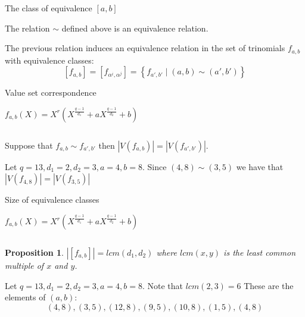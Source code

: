 \documentclass{beamer}
\newtheorem{proposition}{Proposition}
\begin{document}
\begin{frame}{The class of equivalence $[a,b]$}
  
  \begin{lemma}
    The relation $\sim$ defined above is an equivalence relation.
  \end{lemma}

  The previous relation induces an equivalence relation in the set of trinomials $f_{a,b}$ with equivalence classes:
  $$ [f_{a,b}] = [f_{\alpha^i, \alpha^j}] = \left\{ f_{a',b'} \mid (a,b) \sim (a',b') \right\} $$

\end{frame}

\begin{frame}{Value set correspondence}

  {\Large $f_{a,b}(X) = X^r(X^{\frac{q-1}{d_1}} + aX^{\frac{q-1}{d_2}} +b)$}

  $$$$

  \begin{theorem}

    Suppose that $f_{a, b} \sim f_{a',b'}$ then $|V(f_{a, b})| = |V(f_{a', b'})|$.

  \end{theorem}

  \begin{example}
    Let $q = 13, d_1 = 2, d_2 = 3, a = 4, b = 8$. Since $(4,8) \sim (3,5)$ we have that $|V(f_{4, 8})| = |V(f_{3, 5})|$
  \end{example}

\end{frame}

\begin{frame}{Size of equivalence classes}
  
  {\Large $f_{a,b}(X) = X^r(X^{\frac{q-1}{d_1}} + aX^{\frac{q-1}{d_2}} +b)$}

  $$$$

  \begin{proposition}
    $|[f_{a, b}]| = lcm(d_1,d_2)$ where $lcm(x,y)$ is the least common multiple of $x$ and $y$.
  \end{proposition}

  \begin{example}
    Let $q = 13, d_1 = 2, d_2 = 3, a = 4, b = 8$. Note that $lcm(2,3) = 6$ These are the elements of $(a,b)$:
    $$ (4, 8), (3, 5), (12, 8), (9, 5), (10, 8), (1, 5), (4,8) $$
  \end{example}
\end{frame}
\end{document}
